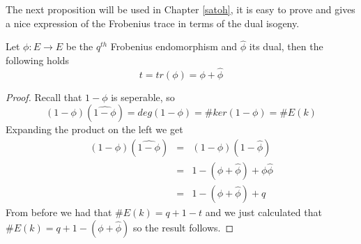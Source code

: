 The next proposition will be used in Chapter \ref{satoh}, it is easy to prove and gives a nice
expression of the Frobenius trace in terms of the dual isogeny.

\begin{prop}
 Let $\phi: E \rightarrow E$ be the $q^{th}$ Frobenius endomorphism and $\widehat{\phi}$ its dual, then
the following holds
$$ t = tr(\phi) = \phi + \widehat{\phi}$$
\end{prop}
\begin{proof}
 Recall that $1-\phi$ is seperable, so $$(1-\phi)(\widehat{1-\phi}) = deg(1-\phi) = \#ker(1-\phi) = \#E(k)$$
Expanding the product on the left we get
\begin{eqnarray}
 (1-\phi)(\widehat{1-\phi}) &=& (1-\phi)(1-\widehat{\phi}) \nonumber \\
			    &=& 1 - (\phi + \widehat{\phi}) + \phi\widehat{\phi} \nonumber \\
			    &=& 1 - (\phi + \widehat{\phi}) + q \nonumber
\end{eqnarray}
From before we had that $\#E(k) = q + 1 - t$ and we just calculated that $\#E(k) = q + 1 - (\phi +\widehat{\phi})$ so
the result follows.
\end{proof}

